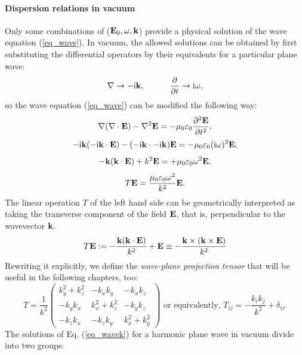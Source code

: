 \paragraph{Dispersion relations in vacuum} %
Only some combinations of ($\mathbf{E}_0, \omega, {\mathbf{k}}$) provide a physical solution of the wave equation (\ref{eq_wave}). In vacuum, the allowed solutions can be obtained by first substituting the differential operators by their equivalents for a particular plane wave: %
\begin{equation} \nabla \rightarrow -{\mathrm i}{\mathbf{k}}, \quad\quad\quad 
\frac{\partial} {\partial t} \rightarrow {\mathrm i}\omega, \label{eq_difftok}\end{equation}
so the wave equation (\ref{eq_wave}) can be modified the following way:
$$					\nabla (\nabla \cdot \mathbf{E}) - \nabla^2 \mathbf{E}				  =	-\mu_0 \varepsilon_0 \frac{\partial^{2} \mathbf{E}}{\partial t^{2}},  $$
$$				 -{\mathrm i}{\mathbf{k}} (-{\mathrm i}{\mathbf{k}} \cdot \mathbf{E})  - (-{\mathrm i}{\mathbf{k}} \cdot -{\mathrm i}{\mathbf{k}}) \mathbf{E} = -\mu_0 \varepsilon_0 ({\mathrm i}\omega)^2 \mathbf{E}, $$
$$   - {\mathbf{k}} ({\mathbf{k}} \cdot \mathbf{E})      +          k^2 \mathbf{E}            = +\mu_0 \varepsilon_0 \omega^{2} \mathbf{E},  $$
\begin{equation}  T\mathbf{E}            = \frac{\mu_0 \varepsilon_0 \omega^{2}}{k^2} \mathbf{E}.  \label{eq_wavek}\end{equation}
The linear operation $T$ of the left hand side can be geometrically interpreted as taking the transverse component of the field $\mathbf{E}$, that is, perpendicular to the wavevector ${\mathbf{k}}$. 
\begin{equation} T\mathbf{E} :=  -\frac{{\mathbf{k}} ({\mathbf{k}} \cdot \mathbf{E})}{k^2} + \mathbf{E}     \equiv     - \frac{{\mathbf{k}}\times({\mathbf{k}}\times\mathbf{E})}{k^2} \label{eq_transverse1}\end{equation}
Rewriting it explicitly, we define the \textit{wave-plane projection tensor} that will be useful in the following chapters, too:
\begin{equation} T = \frac{1}{k^2} 
\left(\begin{array}{ccc} 
	k_y^2+k_z^2  	& -k_x k_y 		& -k_x k_z \\ 
	-k_y k_x 		& k_x^2+k_z^2	& -k_y k_z \\ 
	-k_z k_x 		& -k_z k_y		& k_x^2+k_y^2
	\end{array} \right) 
\text{ or equivalently, }
T_{ij} = - \frac{k_i k_j}{k^2} + \delta_{ij} .  \label{eq_transverse2}\end{equation}
The solutions of Eq. (\ref{eq_wavek}) for a harmonic plane wave in vacuum divide into two groups: %
